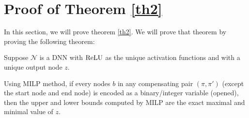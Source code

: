 				
				
				\section{Proof of Theorem \ref{th2}}
				
				In this section, we will prove theorem \ref{th2}. We will prove that theorem by proving the following theorem:
				
				\begin{theorem} \label{thm:2}
				
					
					Suppose $\mathcal{N}$ is a DNN with $\mathrm{ReLU}$ as the unique activation functions and with a unique output node $z$.
					
					Using MILP method, if every nodes $b$ in any compensating pair
					$(\pi,\pi')$ (except the start node and end node) is encoded as a binary/integer variable (opened), then the upper and lower 
					bounds computed by MILP are the exact maximal and minimal value of $z$.
				\end{theorem}
				
